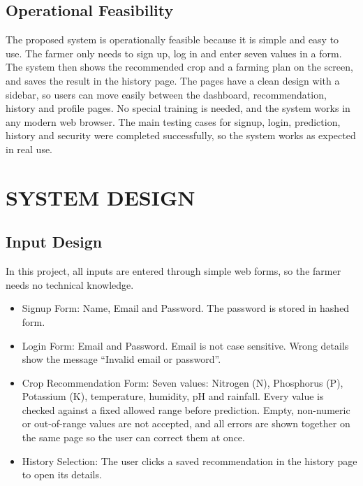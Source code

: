 \section{Operational Feasibility}
The proposed system is operationally feasible because it is simple and easy to use. The farmer only needs to sign up, log in and enter seven values in a form. The system then shows the recommended crop and a farming plan on the screen, and saves the result in the history page. The pages have a clean design with a sidebar, so users can move easily between the dashboard, recommendation, history and profile pages. No special training is needed, and the system works in any modern web browser. The main testing cases for signup, login, prediction, history and security were completed successfully, so the system works as expected in real use.
%
\chapter{SYSTEM DESIGN}
%
\section{Input Design}
 In this project, all inputs are entered through simple web forms, so the farmer needs no technical knowledge.

\begin{itemize}
\item Signup Form: Name, Email and Password. The password is stored in hashed form.
\item Login Form: Email and Password. Email is not case sensitive. Wrong details show the message “Invalid email or password”.
\item Crop Recommendation Form: Seven values: Nitrogen (N), Phosphorus (P), Potassium (K), temperature, humidity, pH and rainfall. Every value is checked against a fixed allowed range before prediction. Empty, non-numeric or out-of-range values are not accepted, and all errors are shown together on the same page so the user can correct them at once.
\item History Selection: The user clicks a saved recommendation in the history page to open its details.
\end{itemize}
\
%
